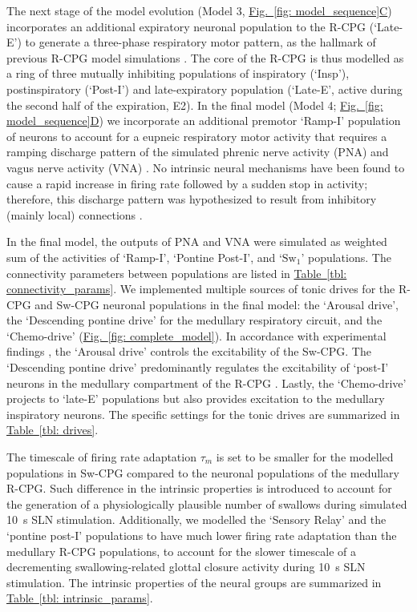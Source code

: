 \documentclass[pdflatex,sn-mathphys-ay]{sn-jnl}%
\renewcommand{\figureautorefname}{Fig.}
\renewcommand{\tableautorefname}{Table}
\newcommand{\Figref}[2][]{\hyperref[#2]{\figureautorefname~\ref*{#2}#1}}
\newcommand{\Tableref}[2][]{\hyperref[#2]{\tableautorefname~\ref*{#2}#1}}
\theoremstyle{thmstyleone}%
\theoremstyle{thmstyletwo}%
\theoremstyle{thmstylethree}%
\begin{document}
The next stage of the model evolution (Model 3, \Figref[C]{fig: model_sequence}) incorporates an additional expiratory neuronal population to the R-CPG (`Late-E') to generate a three-phase respiratory motor pattern, as the hallmark of previous R-CPG model simulations \citep{smith1991pre, rybak1997modeling, rybak2004modeling, rubin2009multiple, molkov2013control, molkov2014closed, molkov2017computational}. The core of the R-CPG is thus modelled as a ring of three mutually inhibiting populations of inspiratory (`Insp'), postinspiratory (`Post-I') and late-expiratory population (`Late-E', active during the second half of the expiration, E2).
In the final model (Model 4; \Figref[D]{fig: model_sequence}) we incorporate an additional premotor `Ramp-I' population of neurons to account for a eupneic respiratory motor activity that requires a ramping discharge pattern of the simulated phrenic nerve activity (PNA) and vagus nerve activity (VNA) \citep{john2003defining, harris2017different}. No intrinsic neural mechanisms have been found to cause a rapid increase in firing rate followed by a sudden stop in activity; therefore, this discharge pattern was hypothesized to result from inhibitory (mainly local) connections \citep{harris2017different}. 

In the final model, the outputs of PNA and VNA were simulated as weighted sum of the activities of `Ramp-I', `Pontine Post-I', and `$\text{Sw}_1$' populations. The connectivity parameters between populations are listed in \Tableref{tbl: connectivity_params}.
We implemented multiple sources of tonic drives for the R-CPG and Sw-CPG neuronal populations in the final model: the `Arousal drive', the `Descending pontine drive' for the medullary respiratory circuit, and the `Chemo-drive' (\Figref[]{fig: complete_model}). In accordance with experimental findings \citep{sato2011sleep, sato2016deglutition}, the `Arousal drive' controls the excitability of the Sw-CPG. The `Descending pontine drive' predominantly regulates the excitability of `post-I' neurons in the medullary compartment of the R-CPG \citep{dutschmann2006kolliker, rybak2004modeling, rybak2004modelling}. Lastly, the `Chemo-drive' projects to `late-E' populations but also provides excitation to the medullary inspiratory neurons. The specific settings for the tonic drives are summarized in \Tableref{tbl: drives}.

The timescale of firing rate adaptation $\tau_m$ is set to be smaller for the modelled populations in Sw-CPG compared to the neuronal populations of the medullary R-CPG. Such difference in the intrinsic properties is introduced to account for the generation of a physiologically plausible number of swallows during simulated 10~s SLN stimulation. Additionally, we modelled the `Sensory Relay' and the `pontine post-I' populations to have much lower firing rate adaptation than the medullary R-CPG populations, to account for the slower timescale of a decrementing swallowing-related glottal closure activity during 10~s SLN stimulation. The intrinsic properties of the neural groups are summarized in \Tableref{tbl: intrinsic_params}. 
\end{document}
